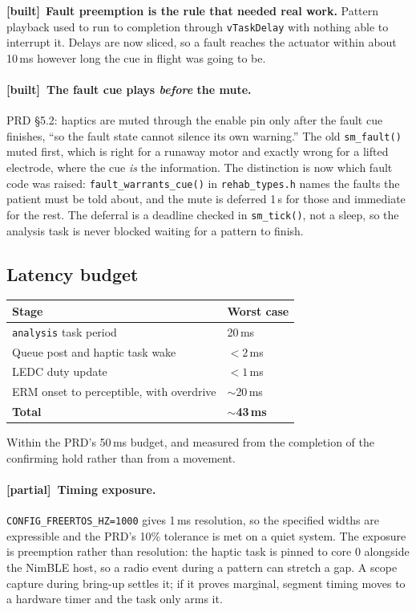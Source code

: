 \documentclass[11pt]{article}
\newcommand{\built}{{\sffamily\scriptsize\color{good}\textbf{[built]}}\ }
\newcommand{\inpart}{{\sffamily\scriptsize\color{marker}\textbf{[partial]}}\ }
\begin{document}
\noindent
\built \textbf{Fault preemption is the rule that needed real work.} Pattern
playback used to run to completion through \texttt{vTaskDelay} with nothing
able to interrupt it. Delays are now sliced, so a fault reaches the actuator
within about 10\,ms however long the cue in flight was going to be.

\paragraph{\built The fault cue plays \emph{before} the mute.} PRD \S5.2:
haptics are muted through the enable pin only after the fault cue finishes,
``so the fault state cannot silence its own warning.'' The old
\texttt{sm\_fault()} muted first, which is right for a runaway motor and
exactly wrong for a lifted electrode, where the cue \emph{is} the information.
The distinction is now which fault code was raised:
\texttt{fault\_warrants\_cue()} in \texttt{rehab\_types.h} names the faults
the patient must be told about, and the mute is deferred 1\,s for those and
immediate for the rest. The deferral is a deadline checked in
\texttt{sm\_tick()}, not a sleep, so the analysis task is never blocked
waiting for a pattern to finish.

\subsection{Latency budget}

\begin{table}[H]
\centering\small
\begin{tabularx}{\linewidth}{@{}X p{24mm}@{}}
\toprule
\textbf{Stage} & \textbf{Worst case} \\
\midrule
\texttt{analysis} task period & 20\,ms \\
Queue post and haptic task wake & $<2$\,ms \\
LEDC duty update & $<1$\,ms \\
ERM onset to perceptible, with overdrive & $\sim$20\,ms \\
\midrule
\textbf{Total} & \textbf{$\sim$43\,ms} \\
\bottomrule
\end{tabularx}
\end{table}

\noindent
Within the PRD's 50\,ms budget, and measured from the completion of the
confirming hold rather than from a movement.

\paragraph{\inpart Timing exposure.} \texttt{CONFIG\_FREERTOS\_HZ=1000} gives
1\,ms resolution, so the specified widths are expressible and the PRD's 10\%
tolerance is met on a quiet system. The exposure is preemption rather than
resolution: the haptic task is pinned to core 0 alongside the NimBLE host, so
a radio event during a pattern can stretch a gap. A scope capture during
bring-up settles it; if it proves marginal, segment timing moves to a hardware
timer and the task only arms it.
\end{document}

